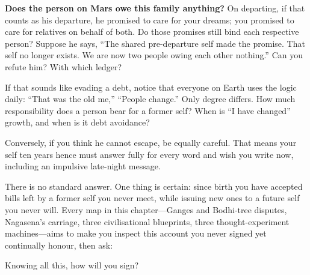 \textbf{Does the person on Mars owe this family anything?} On departing, if that counts as his departure, he promised to care for your dreams; you promised to care for relatives on behalf of both. Do those promises still bind each respective person? Suppose he says, ``The shared pre-departure self made the promise. That self no longer exists. We are now two people owing each other nothing.'' Can you refute him? With which ledger?

If that sounds like evading a debt, notice that everyone on Earth uses the logic daily: ``That was the old me,'' ``People change.'' Only degree differs. How much responsibility does a person bear for a former self? When is ``I have changed'' growth, and when is it debt avoidance?

Conversely, if you think he cannot escape, be equally careful. That means your self ten years hence must answer fully for every word and wish you write now, including an impulsive late-night message.

There is no standard answer. One thing is certain: since birth you have accepted bills left by a former self you never meet, while issuing new ones to a future self you never will. Every map in this chapter---Ganges and Bodhi-tree disputes, Nagasena's carriage, three civilisational blueprints, three thought-experiment machines---aims to make you inspect this account you never signed yet continually honour, then ask:

Knowing all this, how will you sign?
